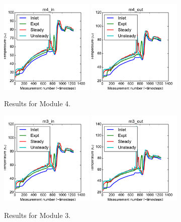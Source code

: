 \documentclass{article}
\begin{document}
\clearpage
\begin{figure}[!ht]
\centering
\includegraphics[width=0.4\textwidth]{../../data/ICSolar/images/Jan31_m4_in_compare.pdf}\hspace{0.05\textwidth}
\includegraphics[width=0.4\textwidth]{../../data/ICSolar/images/Jan31_m4_out_compare.pdf}\hspace{0.05\textwidth}\\
\caption{Results for Module 4.}\end{figure}
\begin{figure}[!ht]
\centering
\includegraphics[width=0.4\textwidth]{../../data/ICSolar/images/Jan31_m3_in_compare.pdf}\hspace{0.05\textwidth}
\includegraphics[width=0.4\textwidth]{../../data/ICSolar/images/Jan31_m3_out_compare.pdf}\hspace{0.05\textwidth}\\
\caption{Results for Module 3.}\end{figure}
\end{document}
